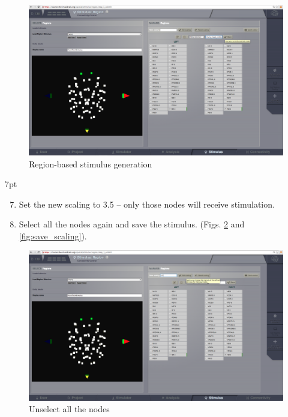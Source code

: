 \documentclass{tufte-handout}
\newenvironment{formal}{%
  \def\FrameCommand{%
    \hspace{1pt}%
    {\color{DarkBlue}\vrule width 2pt}%
    {\color{formalshade}\vrule width 4pt}%
    \colorbox{formalshade}%
  }%
  \MakeFramed{\advance\hsize-\width\FrameRestore}%
  \noindent\hspace{-4.55pt}%
  \begin{adjustwidth}{}{7pt}%
  \vspace{2pt}\vspace{2pt}%
}
{%
  \vspace{2pt}\end{adjustwidth}\endMakeFramed%
}
\begin{document}
\begin{figure}[h]
  \includegraphics[width=\linewidth]{Handout_UI_HeterogenousModelAndStimulation_StimulusRegionSaveSelection}%
  \caption{Region-based stimulus generation}%
  \label{fig:save_selection}%
\end{figure}

\newpage
\begin{formal}
\begin{enumerate}[resume]
\setcounter{enumi}{6}
\item Set the new scaling to 3.5 -- only those nodes will receive stimulation. 
\item Select all the nodes again and save the stimulus. (Figs. \ref{fig:set_scaling} and \ref{fig:save_scaling}).
\end{enumerate}
\end{formal}

\begin{figure}[h]
  \includegraphics[width=\linewidth]{Handout_UI_HeterogenousModelAndStimulation_StimulusRegionSetScaling}%
  \caption{Unselect all the nodes}%
  \label{fig:set_scaling}%
\end{figure}
\end{document}
